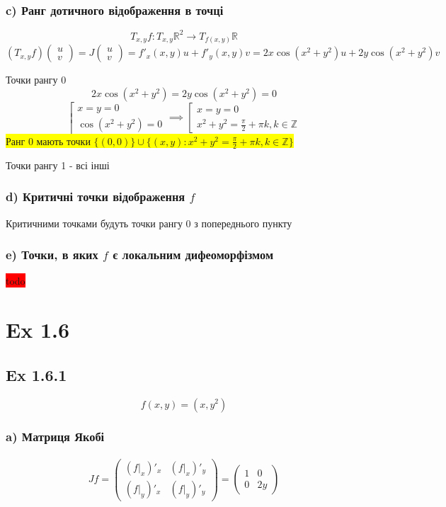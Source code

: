 \documentclass[10pt, a4paper]{article} %
\newcommand{\R}{\mathbb{R}}
\newcommand{\todo}[1]{\colorbox{red}{#1}}
\begin{document}
\subsubsection*{c) Ранг дотичного відображення в точці}
\[T_{x,y} f : T_{x,y}\R^2 \to T_{f(x,y)}\R\]
\[(T_{x,y} f) \begin{pmatrix} u \\ v \end{pmatrix}
= J\begin{pmatrix} u \\ v \end{pmatrix} = f'_x(x,y) u + f'_y(x,y) v = 2x\cos(x^2+y^2)u + 2y\cos(x^2+y^2)v\]

Точки рангу 0
\[2x\cos(x^2+y^2)=2y\cos(x^2+y^2)=0\]
\[\left[\begin{array}{l}
    x=y=0\\
    \cos(x^2+y^2) = 0
\end{array}\right. \implies \left[\begin{array}{l}
    x=y=0\\
    x^2+y^2 = \frac{\pi}{2}+\pi k, k \in \mathbb Z
\end{array}\right. \]
\colorbox{yellow}{Ранг 0 мають точки $\{(0,0)\} \cup \{(x,y) : x^2+y^2 = \frac{\pi}{2}+\pi k, k \in \mathbb Z\}$}

Точки рангу 1 - всі інші

\subsubsection*{d) Критичні точки відображення $f$}

Критичними точками будуть точки рангу 0 з попереднього пункту

\subsubsection*{e) Точки, в яких $f$ є локальним дифеоморфізмом}
\todo{todo}

\section*{Ex 1.6}

\subsection*{Ex 1.6.1}
\[f(x,y) = (x,y^2)\]
\subsubsection*{a) Матриця Якобі}
\begin{align*}
    Jf = \begin{pmatrix}
        (f|_x)'_x & (f|_x)'_y\\
        (f|_y)'_x & (f|_y)'_y
    \end{pmatrix} 
    = \begin{pmatrix}
        1 & 0\\
        0 & 2y
    \end{pmatrix}
\end{align*}
\end{document}
